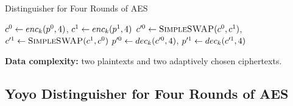 \documentclass[notheorems]{beamer}
\theoremstyle{definition}
\theoremstyle{example}
\begin{document}
    \begin{frame}{Distinguisher for Four Rounds of AES}
        \begin{algorithm}[H]
            \caption{Distinguisher for Four Rounds of AES}
            \label{alg:aes-4-rounds}
            \begin{algorithmic}[1]
                \State \(c^0 \gets enc_k(p^0, 4)\), \(c^1 \gets enc_k(p^1,
                4)\)
                \State \(c^{\prime 0} \gets \textsc{SimpleSWAP}(c^0, c^1)\),
                \(c^{\prime 1} \gets \textsc{SimpleSWAP}(c^1, c^0)\)
                \State \(p^{\prime 0} \gets dec_k(c^{\prime 0}, 4)\), \(p^{\prime
                1} \gets dec_k(c^{\prime 1}, 4)\)
                    \State {}
                \Else
                    \State {}
                \EndIf
            \end{algorithmic}
        \end{algorithm}
        \textbf{Data complexity:} two plaintexts and two adaptively chosen
        ciphertexts.
    \end{frame}

    \subsection{Yoyo Distinguisher for Four Rounds of AES}
    \label{subsec:aes-5-rounds}
\end{document}
